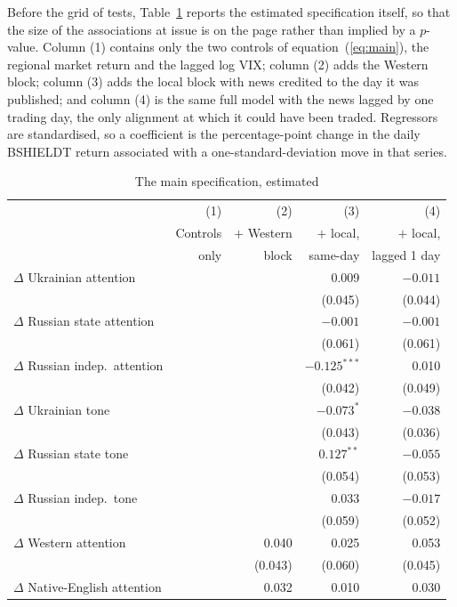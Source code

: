 \documentclass[12pt,a4paper]{article}
\newcommand{\compact}{\setlength{\tabcolsep}{3.5pt}\small}
\begin{document}
Before the grid of tests, Table~\ref{tab:regression} reports the estimated specification itself, so that the size of the associations at issue is on the page rather than implied by a $p$-value. Column (1) contains only the two controls of equation~(\ref{eq:main}), the regional market return and the lagged log VIX; column (2) adds the Western block; column (3) adds the local block with news credited to the day it was published; and column (4) is the same full model with the news lagged by one trading day, the only alignment at which it could have been traded. Regressors are standardised, so a coefficient is the percentage-point change in the daily BSHIELDT return associated with a one-standard-deviation move in that series.

\begin{table}[htbp]
\centering
\caption{The main specification, estimated}
\label{tab:regression}
\begin{threeparttable}
\compact
\begin{tabular}{lrrrr}
\toprule
 & (1) & (2) & (3) & (4) \\
 & Controls & $+$ Western & $+$ local, & $+$ local, \\
 & only & block & same-day & lagged 1 day \\
\midrule
$\Delta$ Ukrainian attention & & & 0.009 & $-0.011$ \\
 & & & (0.045) & (0.044) \\
$\Delta$ Russian state attention & & & $-0.001$ & $-0.001$ \\
 & & & (0.061) & (0.061) \\
$\Delta$ Russian indep.\ attention & & & $-0.125^{***}$ & 0.010 \\
 & & & (0.042) & (0.049) \\
$\Delta$ Ukrainian tone & & & $-0.073^{*}$ & $-0.038$ \\
 & & & (0.043) & (0.036) \\
$\Delta$ Russian state tone & & & $0.127^{**}$ & $-0.055$ \\
 & & & (0.054) & (0.053) \\
$\Delta$ Russian indep.\ tone & & & 0.033 & $-0.017$ \\
 & & & (0.059) & (0.052) \\
\addlinespace
$\Delta$ Western attention & & 0.040 & 0.025 & 0.053 \\
 & & (0.043) & (0.060) & (0.045) \\
$\Delta$ Native-English attention & & 0.032 & 0.010 & 0.030 \\

\end{tabular}
\end{threeparttable}
\end{table}
\end{document}
